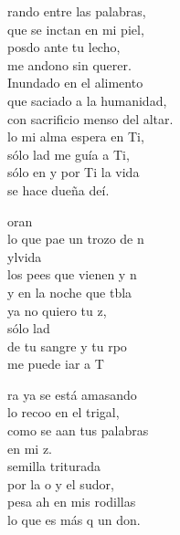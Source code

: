 \begin{cancion}%
	rando entre las palabras,\\
	que se inctan en mi piel,\\
	posdo ante tu lecho,\\
	me andono sin querer.\\
	\jump
	\jump
Inundado en el alimento\\
	que saciado a la humanidad,\\
	con sacrificio menso del altar.\\
	lo mi alma espera en Ti, \\
	sólo lad me guía a Ti, \\
	sólo en y por Ti la vida \\
	se hace dueña deí. \jump\\
	\begin{chorus}%
		oran \\
		lo que pae un trozo de n\\
		ylvida \\
		los pees que vienen y n \\
		y en la noche que tbla \\
		ya no quiero tu z, \\
		sólo lad \\
		de tu sangre y tu rpo   \\
		me puede iar a T \jump\\
	\end{chorus}%
	\jump
	ra ya se está amasando \\
	lo recoo en el trigal, \\
	como se aan tus palabras \\
	en mi z. \\
	\jump
	 semilla triturada \\
	por la o y el sudor, \\
	pesa ah en mis rodillas\\
	lo que es más q un don.\\

\end{cancion}
